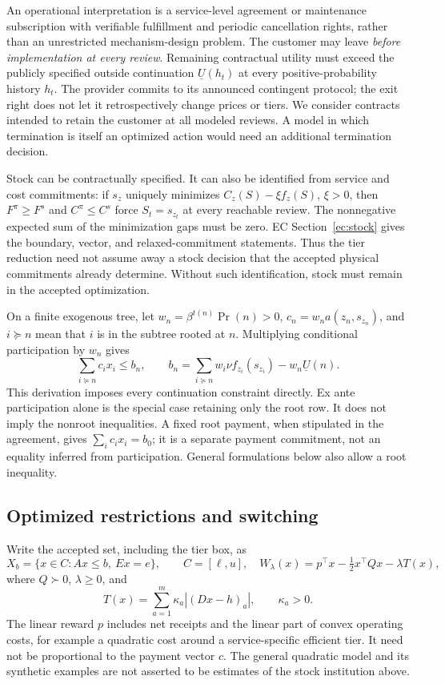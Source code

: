 \documentclass[11pt,letterpaper]{article}
\theoremstyle{definition}\newtheorem{assumption}[theorem]{Assumption}
\begin{document}
An operational interpretation is a service-level agreement or maintenance subscription with verifiable fulfillment and periodic cancellation rights, rather than an unrestricted mechanism-design problem. The customer may leave \emph{before implementation at every review}. Remaining contractual utility must exceed the publicly specified outside continuation $\underline U(h_t)$ at every positive-probability history $h_t$. The provider commits to its announced contingent protocol; the exit right does not let it retrospectively change prices or tiers. We consider contracts intended to retain the customer at all modeled reviews. A model in which termination is itself an optimized action would need an additional termination decision.

Stock can be contractually specified. It can also be identified from service and cost commitments: if $s_z$ uniquely minimizes $C_z(S)-\xi f_z(S)$, $\xi>0$, then $F^\pi\geq F^s$ and $C^\pi\leq C^s$ force $S_t=s_{z_t}$ at every reachable review. The nonnegative expected sum of the minimization gaps must be zero. EC Section~\ref{ec:stock} gives the boundary, vector, and relaxed-commitment statements. Thus the tier reduction need not assume away a stock decision that the accepted physical commitments already determine. Without such identification, stock must remain in the accepted optimization.

On a finite exogenous tree, let $w_n=\beta^{t(n)}\Pr(n)>0$, $c_n=w_na(z_n,s_{z_n})$, and $i\succeq n$ mean that $i$ is in the subtree rooted at $n$. Multiplying conditional participation by $w_n$ gives
\begin{equation}\label{eq:continuation}
 \sum_{i\succeq n}c_i x_i\leq b_n,\qquad
 b_n=\sum_{i\succeq n}w_i\nu f_{z_i}(s_{z_i})-w_n\underline U(n).
\end{equation}
This derivation imposes every continuation constraint directly. Ex ante participation alone is the special case retaining only the root row. It does not imply the nonroot inequalities. A fixed root payment, when stipulated in the agreement, gives $\sum_i c_i x_i=b_0$; it is a separate payment commitment, not an equality inferred from participation. General formulations below also allow a root inequality.

\subsection{Optimized restrictions and switching}
Write the accepted set, including the tier box, as
\begin{equation}\label{eq:poly}
 X_b=\{x\in C:Ax\leq b,\ Ex=e\},\qquad C=[\ell,u],
 \quad W_\lambda(x)=p^\top x-\tfrac12x^\top Qx-\lambda T(x),
\end{equation}
where $Q\succ0$, $\lambda\geq0$, and
\[
 T(x)=\sum_{a=1}^m\kappa_a|(Dx-h)_a|,\qquad \kappa_a>0.
\]
The linear reward $p$ includes net receipts and the linear part of convex operating costs, for example a quadratic cost around a service-specific efficient tier. It need not be proportional to the payment vector $c$. The general quadratic model and its synthetic examples are not asserted to be estimates of the stock institution above.
\end{document}
